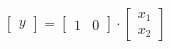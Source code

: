 \documentclass{article}
\begin{document}
\[
\begin{bmatrix}
y
\end{bmatrix}
=
\begin{bmatrix}
1 & 0 
\end{bmatrix}
\cdot
\begin{bmatrix}
x_1 \\
x_2 
\end{bmatrix}
\]
\end{document}
